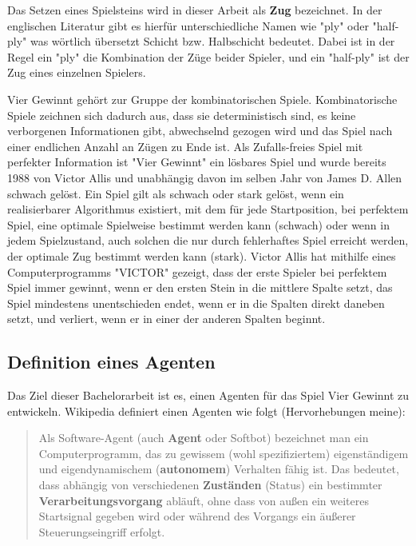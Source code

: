 Das Setzen eines Spielsteins wird in dieser Arbeit als \textbf{Zug} bezeichnet. In der englischen Literatur gibt es hierfür unterschiedliche Namen wie "ply" oder "half-ply" was wörtlich übersetzt Schicht bzw. Halbschicht bedeutet. Dabei ist in der Regel ein "ply" die Kombination der Züge beider Spieler, und ein "half-ply" ist der Zug eines einzelnen Spielers.

Vier Gewinnt gehört zur Gruppe der kombinatorischen Spiele. Kombinatorische Spiele zeichnen sich dadurch aus, dass sie deterministisch sind, es keine verborgenen Informationen gibt, abwechselnd gezogen wird und das Spiel nach einer endlichen Anzahl an Zügen zu Ende ist\autocite{KombinatorischeSpieltheorie2019}. Als Zufalls-freies Spiel mit perfekter Information ist "Vier Gewinnt" ein lösbares Spiel und wurde bereits 1988 von Victor Allis\autocite{allisKnowledgeBasedApproachConnectFour1988} und unabhängig davon im selben Jahr von James D. Allen schwach gelöst\autocite{allenExpertPlayConnectFour}. Ein Spiel gilt als schwach oder stark gelöst, wenn ein realisierbarer Algorithmus existiert, mit dem für jede Startposition, bei perfektem Spiel, eine optimale Spielweise bestimmt werden kann (schwach) oder wenn in jedem Spielzustand, auch solchen die nur durch fehlerhaftes Spiel erreicht werden, der optimale Zug bestimmt werden kann (stark)\autocite{GeloesteSpiele2019}. Victor Allis hat mithilfe eines Computerprogramms "VICTOR" gezeigt, dass der erste Spieler bei perfektem Spiel immer gewinnt, wenn er den ersten Stein in die mittlere Spalte setzt, das Spiel mindestens unentschieden endet, wenn er in die Spalten direkt daneben setzt, und verliert, wenn er in einer der anderen Spalten beginnt.

\subsection{Definition eines Agenten}

Das Ziel dieser Bachelorarbeit ist es, einen Agenten für das Spiel Vier Gewinnt zu entwickeln. Wikipedia definiert einen Agenten wie folgt (Hervorhebungen meine):

\begin{quote}
	Als Software-Agent (auch \textbf{Agent} oder Softbot) bezeichnet man ein Computerprogramm, das zu gewissem (wohl spezifiziertem) eigenständigem und eigendynamischem (\textbf{autonomem}) Verhalten fähig ist. Das bedeutet, dass abhängig von verschiedenen \textbf{Zuständen} (Status) ein bestimmter \textbf{Verarbeitungsvorgang} abläuft, ohne dass von außen ein weiteres Startsignal gegeben wird oder während des Vorgangs ein äußerer Steuerungseingriff erfolgt.
	\autocite{SoftwareAgent2019}
\end{quote}

